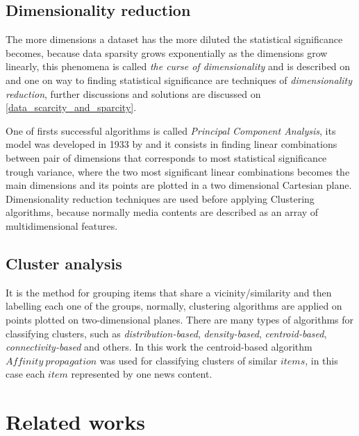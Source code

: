 \documentclass[ecp,tc,english]{iiufrgs}
\begin{document}
        \subsection{Dimensionality reduction}
        The more dimensions a dataset has the more diluted the statistical significance becomes, 
        because data sparsity grows exponentially as the dimensions grow linearly,  
        this phenomena is called \textit{the curse of dimensionality} and is described on \cite{10.1093/imamat/24.1.59} and one on way to finding statistical significance are techniques of \textit{dimensionality reduction}, further discussions and solutions are discussed on \ref{data_scarcity_and_sparcity}.
        
        One of firsts successful algorithms is called \textit{Principal Component Analysis}, 
        its model was developed in 1933 by \cite{hotelling:33} and it consists in finding linear combinations between pair of dimensions that corresponds to most statistical significance trough variance, where the two most significant linear combinations becomes the main dimensions and its points are plotted in a two dimensional Cartesian plane.
        Dimensionality reduction techniques are used before applying Clustering algorithms, because normally media contents are described as an array of multidimensional features.
        
        \subsection{Cluster analysis}
        It is the method for grouping items that share a vicinity/similarity and then labelling each one of the groups, normally, clustering algorithms are applied on points plotted on two-dimensional planes. There are many types of algorithms for classifying clusters, such as \textit{distribution-based}, \textit{density-based}, \textit{centroid-based}, \textit{connectivity-based} and others. In this work the centroid-based algorithm \(Affinity\ propagation\) was used for classifying clusters of similar \(items\), in this case each \(item\) represented by one news content.

\section{Related works}
    
\end{document}
